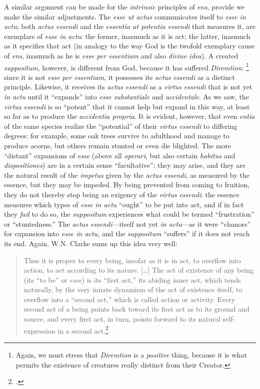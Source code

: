 A similar argument can be made for the \emph{intrinsic} principles of \emph{ens}, provide we make the similar adjustments. The \emph{esse ut actus} communicates itself to \emph{esse in actu}; both \emph{actus essendi} and the \emph{essentia ut potentia essendi} that measures it, are exemplars of \emph{esse in actu}: the former, inasmuch as it is act; the latter, inasmuch as it specifies that act (in analogy to the way God is the twofold exemplary cause of \emph{ens}, inasmuch as he is \emph{esse per essentiam} and also \emph{divine idea}). A created \emph{suppositum}, however, is different from God, because it has suffered \emph{Diremtion}:%
%
\footnote{Again, we must stress that \emph{Diremtion} is a \emph{positive} thing, because it is what permits the existence of creatures really distinct from their Creator.} since it is not \emph{esse per essentiam}, it possesses its \emph{actus essendi} as a distinct principle. Likewise, it receives its \emph{actus essendi} as a \emph{virtus essendi} that is not yet \emph{in actu} until it “expands” into \emph{esse substantiale} and \emph{accidentale}. As we saw, the \emph{virtus essendi} is so “potent” that it cannot help but expand in this way, at least so far as to produce the \emph{accidentia propria}. It is evident, however, that even \emph{entia} of the same species realize the “potential” of their \emph{virtus essendi} to differing degrees: for example, some oak trees survive to adulthood and manage to produce acorns, but others remain stunted or even die blighted. The more “distant” expansions of \emph{esse} (above all \emph{operari}, but also certain \emph{habitus} and \emph{dispositiones}) are in a certain sense “facultative”: they may arise, and they are the natural result of the \emph{impetus} given by the \emph{actus essendi}, as measured by the essence, but they may be impeded. By being prevented from coming to fruition, they do not thereby stop being an exigency of the \emph{virtus essendi}: the essence measures which types of \emph{esse in actu} “ought” to be put into act, and if in fact they \emph{fail} to do so, the \emph{suppositum} experiences what could be termed “frustration” or “stuntedness.” The \emph{actus essendi}—itself not yet \emph{in actu}—as it were “clamors” for expansion into \emph{esse in actu}, and the \emph{suppositum} “suffers” if it does not reach its end. Again, W.N. Clarke sums up this idea very well:
%
\begin{quotation}
Thus it is proper to every being, insofar as it is in act, to overflow into action, to act according to its nature. [\ldots] The act of existence of any being (its \enquote{to be} or \emph{esse}) is its \enquote{first act,} its abiding inner act, which tends naturally, by the very innate dynamism of the act of existence itself, to overflow into a \enquote{second act,} which is called action or activity. Every second act of a being points back toward its first act as to its ground and source, and every first act, in turn, points forward to its natural self-expression in a second act.\footcite[64]{clarke:action}
\end{quotation}

